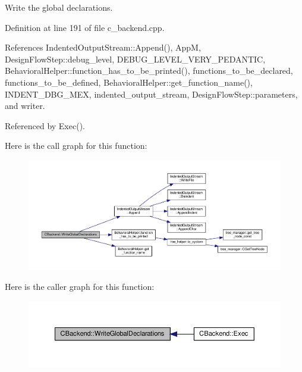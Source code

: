 Write the global declarations. 



Definition at line 191 of file c\+\_\+backend.\+cpp.



References Indented\+Output\+Stream\+::\+Append(), AppM, Design\+Flow\+Step\+::debug\+\_\+level, D\+E\+B\+U\+G\+\_\+\+L\+E\+V\+E\+L\+\_\+\+V\+E\+R\+Y\+\_\+\+P\+E\+D\+A\+N\+T\+IC, Behavioral\+Helper\+::function\+\_\+has\+\_\+to\+\_\+be\+\_\+printed(), functions\+\_\+to\+\_\+be\+\_\+declared, functions\+\_\+to\+\_\+be\+\_\+defined, Behavioral\+Helper\+::get\+\_\+function\+\_\+name(), I\+N\+D\+E\+N\+T\+\_\+\+D\+B\+G\+\_\+\+M\+EX, indented\+\_\+output\+\_\+stream, Design\+Flow\+Step\+::parameters, and writer.



Referenced by Exec().

Here is the call graph for this function\+:
\nopagebreak
\begin{figure}[H]
\begin{center}
\leavevmode
\includegraphics[width=350pt]{d3/de2/classCBackend_abe2034d792eff87acf84b9212bae06c9_cgraph}
\end{center}
\end{figure}
Here is the caller graph for this function\+:
\nopagebreak
\begin{figure}[H]
\begin{center}
\leavevmode
\includegraphics[width=350pt]{d3/de2/classCBackend_abe2034d792eff87acf84b9212bae06c9_icgraph}
\end{center}
\end{figure}
\mbox{\label{classCBackend_aa3c46605226753185304ebc7b9adf463}} 

